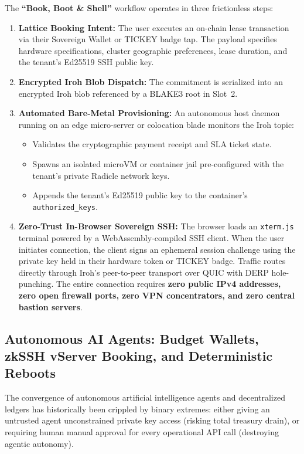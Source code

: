 \documentclass[a4paper,11pt,twoside,parskip=half-,headings=small]{scrartcl}
\newcommand{\code}[1]{\texttt{#1}}
\begin{document}
The \textbf{``Book, Boot \& Shell''} workflow operates in three frictionless steps:
\begin{enumerate}
  \item \textbf{Lattice Booking Intent:} The user executes an on-chain lease transaction
via their Sovereign Wallet or TICKEY badge tap. The payload specifies hardware
specifications, cluster geographic preferences, lease duration, and the tenant's
Ed25519 SSH public key.
  \item \textbf{Encrypted Iroh Blob Dispatch:} The commitment is serialized into an encrypted
Iroh blob referenced by a BLAKE3 root in Slot~2.
  \item \textbf{Automated Bare-Metal Provisioning:} An autonomous host daemon running on an
edge micro-server or colocation blade monitors the Iroh topic:
\begin{itemize}
\item Validates the cryptographic payment receipt and SLA ticket state.
\item Spawns an isolated microVM or container jail pre-configured with the tenant's
private Radicle network keys.
\item Appends the tenant's Ed25519 public key to the container's \code{authorized\_keys}.
\end{itemize}
  \item \textbf{Zero-Trust In-Browser Sovereign SSH:} The browser loads an \code{xterm.js}
terminal powered by a WebAssembly-compiled SSH client. When the user initiates
connection, the client signs an ephemeral session challenge using the private key
held in their hardware token or TICKEY badge. Traffic routes directly through Iroh's
peer-to-peer transport over QUIC with DERP hole-punching. The entire connection
requires \textbf{zero public IPv4 addresses, zero open firewall ports, zero VPN
concentrators, and zero central bastion servers}.
\end{enumerate}

\subsection{Autonomous AI Agents: Budget Wallets, zkSSH vServer Booking, and Deterministic Reboots}
\label{sec:ai_agent_zkssh}

The convergence of autonomous artificial intelligence agents and decentralized ledgers has historically been crippled
by binary extremes: either giving an untrusted agent unconstrained private key access (risking total treasury drain),
or requiring human manual approval for every operational API call (destroying agentic autonomy).
\end{document}
